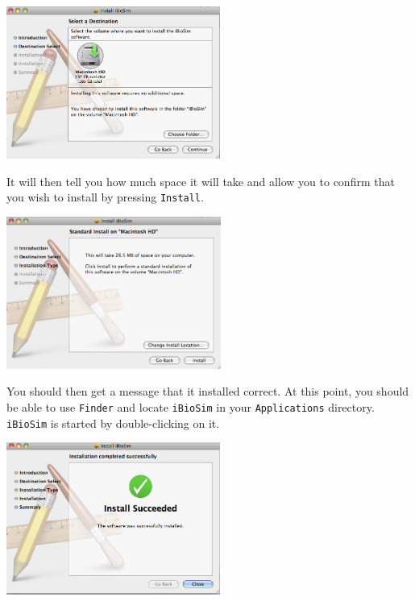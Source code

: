 \documentclass[titlepage,11pt]{article}
\begin{document}
\includegraphics[height=50mm]{screenshots/select}

It will then tell you how much space it will take and allow you to
confirm that you wish to install by pressing {\tt Install}.

\includegraphics[height=50mm]{screenshots/installType}

You should then get a message that it installed correct.  At this
point, you should be able to use {\tt Finder} and locate {\tt iBioSim}
in your {\tt Applications} directory.  {\tt iBioSim} is started by
double-clicking on it.

\includegraphics[height=50mm]{screenshots/success}
\end{document}
